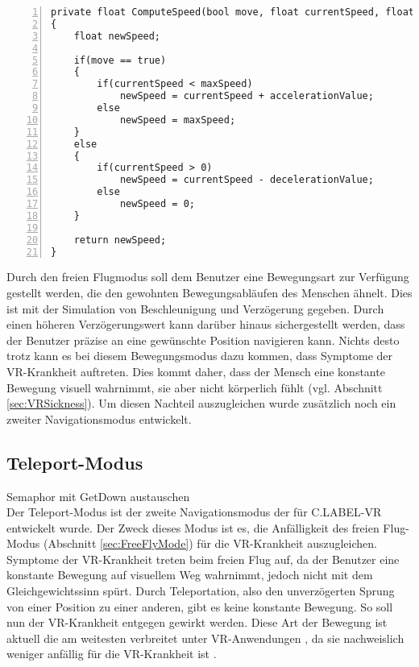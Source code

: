 \begin{lstlisting}[caption={Vereinfachte Implementierung des Beschleunigungs- und Verzögerungsprinzip in eine einzelne Richtung}, captionpos=t, numbers=left, label=lst:FreeFly]
private float ComputeSpeed(bool move, float currentSpeed, float maxSpeed ,float accelerationValue, float decelerationValue)
{
	float newSpeed;	
	
	if(move == true)
	{
		if(currentSpeed < maxSpeed)
			newSpeed = currentSpeed + accelerationValue;
		else
			newSpeed = maxSpeed;
	}
	else
	{
		if(currentSpeed > 0)
			newSpeed = currentSpeed - decelerationValue;
		else
			newSpeed = 0;
	}
	
	return newSpeed;
}
\end{lstlisting}
\quad

Durch den freien Flugmodus soll dem Benutzer eine Bewegungsart zur Verfügung gestellt werden, die den gewohnten Bewegungsabläufen des Menschen ähnelt. Dies ist mit der Simulation von Beschleunigung und Verzögerung gegeben. Durch einen höheren Verzögerungswert kann darüber hinaus sichergestellt werden, dass der Benutzer präzise an eine gewünschte Position navigieren kann. Nichts desto trotz kann es bei diesem Bewegungsmodus dazu kommen, dass Symptome der VR-Krankheit auftreten. Dies kommt daher, dass der Mensch eine konstante Bewegung visuell wahrnimmt, sie aber nicht körperlich fühlt (vgl. Abschnitt \ref{sec:VRSickness}). Um diesen Nachteil auszugleichen wurde zusätzlich noch ein zweiter Navigationsmodus entwickelt.
 
\subsection{Teleport-Modus}
\label{sec:TeleportMode}
Semaphor mit GetDown austauschen\\

Der Teleport-Modus ist der zweite Navigationsmodus der für C.LABEL-VR entwickelt wurde. Der Zweck dieses Modus ist es, die Anfälligkeit des freien Flug-Modus (Abschnitt \ref{sec:FreeFlyMode}) für die VR-Krankheit auszugleichen. Symptome der VR-Krankheit treten beim freien Flug auf, da der Benutzer eine konstante Bewegung auf visuellem Weg wahrnimmt, jedoch nicht mit dem Gleichgewichtssinn spürt. Durch Teleportation, also den unverzögerten Sprung von einer Position zu einer anderen, gibt es keine konstante Bewegung. So soll nun der VR-Krankheit entgegen gewirkt werden. Diese Art der Bewegung ist aktuell die am weitesten verbreitet unter VR-Anwendungen \cite{bib:VRLocomotionReview}, da sie nachweislich weniger anfällig für die VR-Krankheit ist \cite{bib:PointTeleport}.\\


